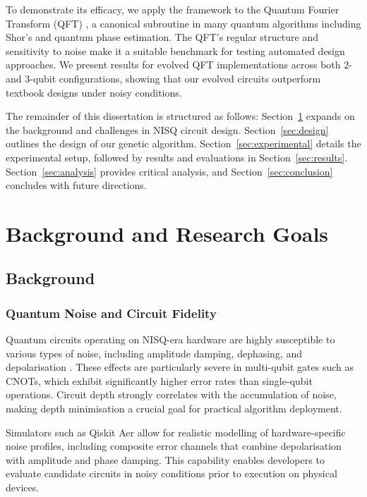 \documentclass[11pt,a4paper]{article}
\begin{document}
To demonstrate its efficacy, we apply the framework to the Quantum Fourier Transform (QFT) \cite{Jozsa1997QuantumAA}, a canonical subroutine in many quantum algorithms including Shor’s and quantum phase estimation. The QFT’s regular structure and sensitivity to noise make it a suitable benchmark for testing automated design approaches. We present results for evolved QFT implementations across both 2- and 3-qubit configurations, showing that our evolved circuits outperform textbook designs under noisy conditions.\newline

The remainder of this dissertation is structured as follows: Section~\ref{sec:background} expands on the background and challenges in NISQ circuit design. Section~\ref{sec:design} outlines the design of our genetic algorithm. Section~\ref{sec:experimental} details the experimental setup, followed by results and evaluations in Section~\ref{sec:results}. Section~\ref{sec:analysis} provides critical analysis, and Section~\ref{sec:conclusion} concludes with future directions.

%
%
\section{Background and Research Goals} \label{sec:background}
\subsection{Background}
\subsubsection*{Quantum Noise and Circuit Fidelity}
Quantum circuits operating on NISQ-era hardware are highly susceptible to various types of noise, including amplitude damping, dephasing, and depolarisation \cite{Clerk2008IntroductionTQ}. These effects are particularly severe in multi-qubit gates such as CNOTs, which exhibit significantly higher error rates than single-qubit operations. Circuit depth strongly correlates with the accumulation of noise, making depth minimisation a crucial goal for practical algorithm deployment.\newline

Simulators such as Qiskit Aer \cite{ibm_qiskit_aer} allow for realistic modelling of hardware-specific noise profiles, including composite error channels that combine depolarisation with amplitude and phase damping. This capability enables developers to evaluate candidate circuits in noisy conditions prior to execution on physical devices.
\end{document}
